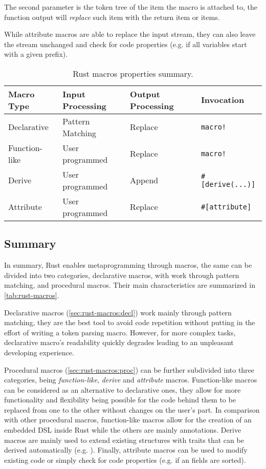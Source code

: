 The second parameter is the token tree of the item the macro is attached to,
the function output will \emph{replace} such item with the return item or items.

While attribute macros are able to replace the input stream,
they can also leave the stream unchanged and check for code properties (e.g. if all variables start with a given prefix).



\begin{table}
	\centering
	\begin{tabular}{l|l|l|l}
		Macro Type    & Input Processing & Output Processing & Invocation                 \\
		\hline
		Declarative   & Pattern Matching & Replace           & \texttt{macro!}            \\
		Function-like & User programmed  & Replace           & \texttt{macro!}            \\
		Derive        & User programmed  & Append            & \texttt{\#{[}derive(...)]} \\
		Attribute     & User programmed  & Replace           & \texttt{\#{[}attribute]}
	\end{tabular}
	\caption{Rust macros properties summary.}
	\label{tab:rust-macros}
\end{table}

\subsection{Summary}
In summary, Rust enables metaprogramming through macros, the same can be divided into two categories,
declarative macros, with work through pattern matching, and procedural macros.
Their main characteristics are summarized in \autoref{tab:rust-macros}.

Declarative macros (\autoref{sec:rust-macros:decl}) work mainly through pattern matching,
they are the best tool to avoid code repetition without putting in the effort of writing a token parsing macro.
However, for more complex tasks, declarative macro's readability quickly degrades leading to an unpleasant developing experience.

Procedural macros (\autoref{sec:rust-macros:proc}) can be further subdivided into three categories,
being \emph{function-like}, \emph{derive} and \emph{attribute} macros.
Function-like macros can be considered as an alternative to declarative ones,
they allow for more functionality and flexibility being possible for the code behind them
to be replaced from one to the other without changes on the user's part.
In comparison with other procedural macros, function-like macros allow for the creation of an embedded DSL inside Rust while the others are mainly annotations.
Derive macros are mainly used to extend existing structures with traits that can be derived automatically (e.g. ).
Finally, attribute macros can be used to modify existing code or simply check for code properties (e.g. if an  fields are sorted).


